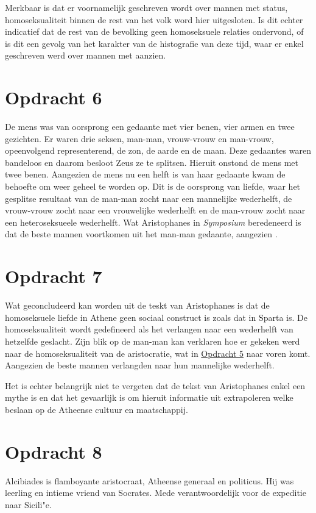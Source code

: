 \documentclass[11pt]{amsart}
\begin{document}
Merkbaar is dat er voornamelijk geschreven wordt over mannen met status, homoseksualiteit binnen de rest van het volk
word hier uitgesloten. Is dit echter indicatief dat de rest van de bevolking geen homoseksuele relaties ondervond, of
is dit een gevolg van het karakter van de histografie van deze tijd, waar er enkel geschreven werd over mannen met
aanzien.

\section*{Opdracht 6}
De mens was van oorsprong een gedaante met vier benen, vier armen en twee gezichten. Er waren drie seksen, man-man, vrouw-vrouw en man-vrouw, opeenvolgend representerend, de zon, de aarde en de maan.
Deze gedaantes waren bandeloos en daarom besloot Zeus ze te splitsen. Hieruit onstond de mens met twee benen. Aangezien de mens nu een helft is van haar gedaante kwam de behoefte om weer geheel te worden op.
Dit is de oorsprong van liefde, waar het gesplitse resultaat van de man-man zocht naar een mannelijke wederhelft, de vrouw-vrouw zocht naar een vrouwelijke wederhelft en de man-vrouw zocht naar een heteroseksueele wederhelft. \autocite{platoSymposium189d-193a}
Wat Aristophanes in \textit{Symposium} beredeneerd is dat de beste mannen voortkomen uit het man-man gedaante, aangezien \autocite{platoSymposium189d-193a}.

\section*{Opdracht 7}
Wat geconcludeerd kan worden uit de teskt van Aristophanes is dat de homoseksuele liefde in Athene geen sociaal construct is zoals dat in Sparta is. De homoseksualiteit wordt gedefineerd als het verlangen naar een wederhelft van hetzelfde geslacht.
Zijn blik op de man-man kan verklaren hoe er gekeken werd naar de homoseksualiteit van de aristocratie, wat in \hyperref[opdracht5]{Opdracht 5} naar voren komt. Aangezien de beste mannen verlangden naar hun mannelijke wederhelft.

Het is echter belangrijk niet te vergeten dat de tekst van Aristophanes enkel een mythe is en dat het gevaarlijk is om
hieruit informatie uit extrapoleren welke beslaan op de Atheense cultuur en
maatschappij.\autocite{chatgptResponseHoeverreDenk2023}

\section*{Opdracht 8}
Alcibiades is flamboyante aristocraat, Atheense generaal en politicus. Hij was leerling en intieme vriend van Socrates. Mede verantwoordelijk voor de expeditie naar Sicili"e.
\end{document}
